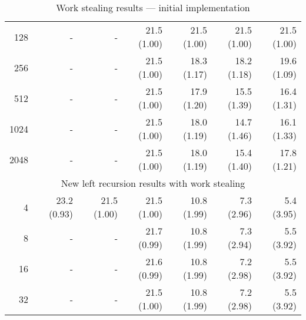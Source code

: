 \begin{table}
\begin{center}
\begin{tabular}{r|rr|rrrr}
128  &-&-& 21.5 (1.00) & 21.5 (1.00) & 21.5 (1.00) & 21.5 (1.00) \\
256  &-&-& 21.5 (1.00) & 18.3 (1.17) & 18.2 (1.18) & 19.6 (1.09) \\
512  &-&-& 21.5 (1.00) & 17.9 (1.20) & 15.5 (1.39) & 16.4 (1.31) \\
1024 &-&-& 21.5 (1.00) & 18.0 (1.19) & 14.7 (1.46) & 16.1 (1.33) \\
2048 &-&-& 21.5 (1.00) & 18.0 (1.19) & 15.4 (1.40) & 17.8 (1.21) \\
\hline
\hline
\multicolumn{7}{c}{New left recursion results with work stealing} \\
\hline
4        & 23.2 (0.93) & 21.5 (1.00)
         & 21.5 (1.00) & 10.8 (1.99) &  7.3 (2.96) &  5.4 (3.95) \\
8    &-&-& 21.7 (0.99) & 10.8 (1.99) &  7.3 (2.94) &  5.5 (3.92) \\
16   &-&-& 21.6 (0.99) & 10.8 (1.99) &  7.2 (2.98) &  5.5 (3.92) \\
32   &-&-& 21.5 (1.00) & 10.8 (1.99) &  7.2 (2.98) &  5.5 (3.92) \\
\end{tabular}
\end{center}
\caption{Work stealing results --- initial implementation}
\label{tab:work_stealing_initial}
\end{table}

